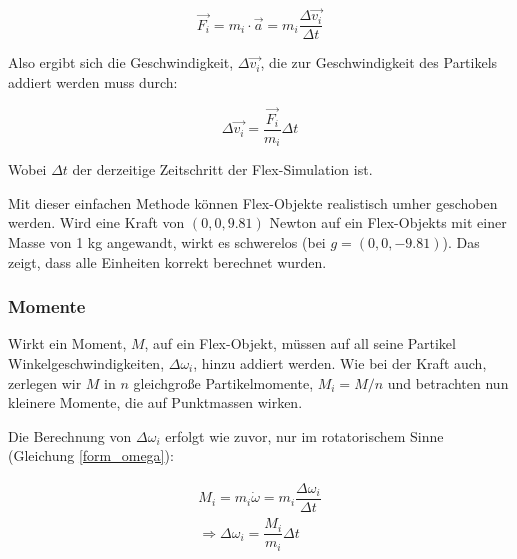 \begin{equation}
\vec{F_i} = m_i \cdot \vec{a} = m_i \dfrac{\Delta \vec{v_i}}{\Delta t}
\label{form_F}
\end{equation}

Also ergibt sich die Geschwindigkeit, $\Delta \vec{v_i}$, die zur Geschwindigkeit des Partikels addiert werden muss durch:

\begin{equation}
\Delta \vec{v_i} = \dfrac{\vec{F_i}}{m_i}\Delta t
\label{form_dv}
\end{equation}

Wobei $\Delta t$ der derzeitige Zeitschritt der Flex-Simulation ist. 


Mit dieser einfachen Methode können Flex-Objekte realistisch umher geschoben werden. Wird eine Kraft von $(0 , 0 , 9.81 )$ Newton auf ein Flex-Objekts mit einer Masse von 1 kg angewandt, wirkt es schwerelos (bei $g=(0 , 0 , -9.81 )$). Das zeigt, dass alle Einheiten korrekt berechnet wurden.


\subsubsection{Momente}

Wirkt ein Moment, $M$, auf ein Flex-Objekt, müssen auf all seine Partikel Winkelgeschwindigkeiten, $\Delta \omega_i$, hinzu addiert werden. Wie bei der Kraft auch, zerlegen wir $M$ in $n$ gleichgroße Partikelmomente, $M_i=M/n$ und betrachten nun kleinere Momente, die auf Punktmassen wirken.

Die Berechnung von $\Delta \omega_i$ erfolgt wie zuvor, nur im rotatorischem Sinne (Gleichung \ref{form_omega}):

\begin{equation}
\begin{split}
M_i = m_i   \dot{\omega} = m_i \dfrac{\Delta \omega_i}{\Delta t} \\
\Rightarrow  \Delta \omega_i = \dfrac{M_i}{m_i} \Delta t
\end{split}
\label{form_omega}
\end{equation}

